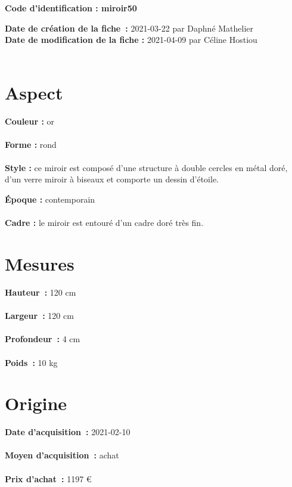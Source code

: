 
     {\bf \huge Code d’identification : miroir50} \\
    \newline \hr \begin{center} 
       
    \end{center} 
    {\bf \large Date de création de la fiche :} 2021-03-22
    {par Daphné Mathelier} 
    \\ {\bf \large Date de modification de la fiche :} 2021-04-09
    {par Céline Hostiou} \\ \\ \hr 
    \section* {Aspect} 
    {\bf \large Couleur :} or
    \\ \\ {\bf \large Forme :} rond 
    \\ \\ {\bf \large Style :} 
            ce miroir est composé d’une structure à double cercles en métal
                doré, d’un verre miroir à biseaux et comporte un dessin d’étoile.
        
        {\bf \large Époque :} contemporain 
    \\ \\ {\bf \large Cadre :} le miroir est entouré d’un cadre doré très fin. 
    \section* {Mesures}
     {\bf \large Hauteur :} 120 cm \\ \\
   {\bf \large Largeur :} 120 cm \\ \\
   {\bf \large Profondeur :} 4 cm \\ \\
   {\bf \large Poids :} 10 kg
  
    \section* {Origine} 
    {\bf \large Date d’acquisition :} 2021-02-10 \\ \\
    {\bf \large Moyen d’acquisition :} achat \\ \\
     {\bf \large Prix d’achat :}
        1197 € 
      
